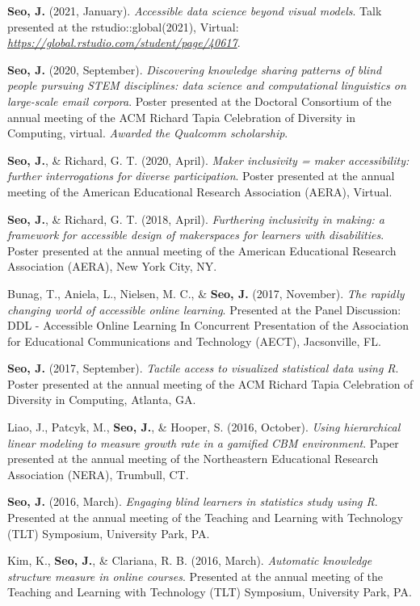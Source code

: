 \documentclass[11pt,a4paper,]{awesome-cv}
\begin{document}
\textbf{Seo, J.} (2021, January). \emph{Accessible data science beyond
  visual models}. Talk presented at the rstudio::global(2021), Virtual:
\emph{\url{https://global.rstudio.com/student/page/40617}}.

\textbf{Seo, J.} (2020, September). \emph{Discovering knowledge sharing
  patterns of blind people pursuing STEM disciplines: data science and
  computational linguistics on large-scale email corpora}. Poster
presented at the Doctoral Consortium of the annual meeting of the ACM
Richard Tapia Celebration of Diversity in Computing, virtual.
\emph{Awarded the Qualcomm scholarship}.

\textbf{Seo, J.}, \& Richard, G. T. (2020, April). \emph{Maker
  inclusivity = maker accessibility: further interrogations for diverse
  participation}. Poster presented at the annual meeting of the American
Educational Research Association (AERA), Virtual.

\textbf{Seo, J.}, \& Richard, G. T. (2018, April). \emph{Furthering
  inclusivity in making: a framework for accessible design of makerspaces
  for learners with disabilities}. Poster presented at the annual meeting
of the American Educational Research Association (AERA), New York City,
NY.

Bunag, T., Aniela, L., Nielsen, M. C., \& \textbf{Seo, J.} (2017,
November). \emph{The rapidly changing world of accessible online
  learning}. Presented at the Panel Discussion: DDL - Accessible Online
Learning In Concurrent Presentation of the Association for Educational
Communications and Technology (AECT), Jacsonville, FL.

\textbf{Seo, J.} (2017, September). \emph{Tactile access to visualized
  statistical data using R}. Poster presented at the annual meeting of the
ACM Richard Tapia Celebration of Diversity in Computing, Atlanta, GA.

Liao, J., Patcyk, M., \textbf{Seo, J.}, \& Hooper, S. (2016, October).
\emph{Using hierarchical linear modeling to measure growth rate in a
  gamified CBM environment}. Paper presented at the annual meeting of the
Northeastern Educational Research Association (NERA), Trumbull, CT.

\textbf{Seo, J.} (2016, March). \emph{Engaging blind learners in
  statistics study using R}. Presented at the annual meeting of the
Teaching and Learning with Technology (TLT) Symposium, University Park,
PA.

Kim, K., \textbf{Seo, J.}, \& Clariana, R. B. (2016, March).
\emph{Automatic knowledge structure measure in online courses}.
Presented at the annual meeting of the Teaching and Learning with
Technology (TLT) Symposium, University Park, PA.
\end{document}
